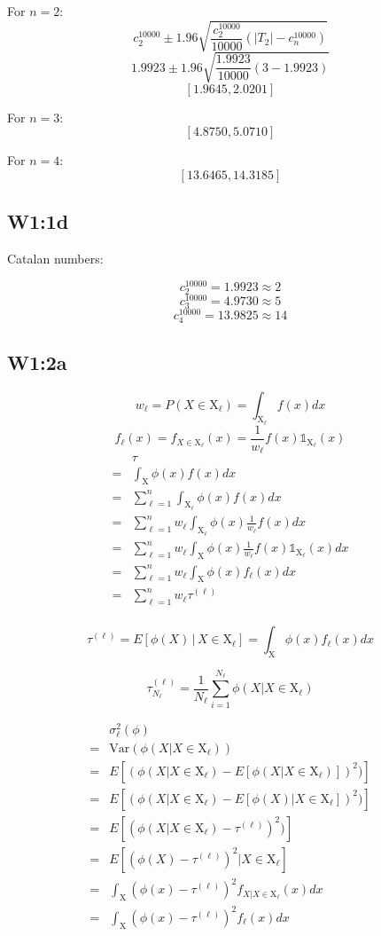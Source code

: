 \documentclass{article}
\begin{document}
For \(n=2\):
\[c_2^{10000} \pm 1.96\sqrt{\frac{c_2^{10000}}{10000}(|T_2|-c_n^{10000})}\]
\[1.9923 \pm 1.96\sqrt{\frac{1.9923}{10000}(3-1.9923)}\]
\[[1.9645,2.0201]\]

For \(n=3\):
\[[4.8750,5.0710]\]

For \(n=4\):
\[[13.6465,14.3185]\]

\subsection{W1:1d}

Catalan numbers:

\[c_2^{10000} = 1.9923 \approx 2\]
\[c_3^{10000} = 4.9730 \approx 5\]
\[c_4^{10000} = 13.9825 \approx 14\]

\subsection{W1:2a}

\[w_\ell = P(X\in\text{X}_\ell) = \int_{\text{X}_\ell} f(x)dx\]
\[f_\ell(x) = f_{X\in\text{X}_\ell}(x) = \frac{1}{w_\ell} f(x)\mathds{1}_{\text{X}_\ell}(x)\]
\begin{align*}
   & \tau \\
   =& \int_{\text{X}} \phi(x)f(x)dx \\
   =& \sum_{\ell=1}^n\int_{\text{X}_\ell} \phi(x)f(x)dx \\
   =& \sum_{\ell=1}^n w_\ell\int_{\text{X}_\ell} \phi(x)\frac{1}{w_\ell}f(x)dx \\
   =& \sum_{\ell=1}^n w_\ell\int_{\text{X}} \phi(x)\frac{1}{w_\ell}f(x)\mathds{1}_{\text{X}_\ell}(x)dx \\
   =& \sum_{\ell=1}^n w_\ell\int_{\text{X}} \phi(x)f_\ell(x)dx \\
   =& \sum_{\ell=1}^n w_\ell \tau^{(\ell)} \\
\end{align*}

\[\tau^{(\ell)} = E[\phi(X)\,|\,X\in\text{X}_\ell] = \int_{\text{X}}\phi(x)f_\ell(x)dx\]

\[\tau_{N_\ell}^{(\ell)} = \frac{1}{N_\ell} \sum_{i=1}^{N_\ell} \phi(X|X\in \text{X}_\ell)\]

\begin{align*}
   & \sigma_\ell^2(\phi) \\
   =& \text{Var}(\phi(X|X\in\text{X}_\ell)) \\
   =& E[(\phi(X|X\in\text{X}_\ell)-E[\phi(X|X\in\text{X}_\ell)])^2)] \\
   =& E[(\phi(X|X\in\text{X}_\ell)-E[\phi(X)|X\in\text{X}_\ell])^2)] \\
   =& E[(\phi(X|X\in\text{X}_\ell)-\tau^{(\ell)})^2)] \\
   =& E[(\phi(X)-\tau^{(\ell)})^2|X\in\text{X}_\ell] \\
   =& \int_\text{X}(\phi(x)-\tau^{(\ell)})^2 f_{X|X\in\text{X}_\ell}(x) dx \\
   =& \int_\text{X}(\phi(x)-\tau^{(\ell)})^2 f_\ell(x) dx \\
\end{align*}
\end{document}
